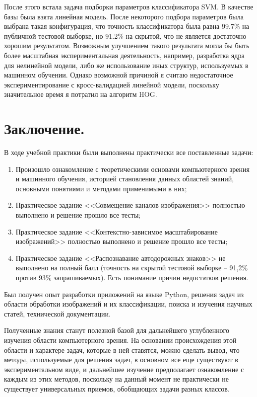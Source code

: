 \documentclass[a4paper, 12pt]{article}
\begin{document}
	После этого встала задача подборки параметров классификатора SVM. В качестве базы была взята линейная модель. После некоторого подбора параметров была выбрана такая конфигурация, что точность классификатора была равна 99.7\% на публичной тестовой выборке, но 91.2\% на скрытой, что не является достаточно хорошим результатом. Возможным улучшением такого результата могла бы  быть более масштабная экспериментальная деятельность, например, разработка ядра для нелинейной модели, либо же использование иных структур, используемых в машинном обучении. Однако возможной причиной я считаю недостаточное экспериментирование с кросс-валидацией линейной модели, поскольку значительное время я потратил на алгоритм HOG.


\newpage
\section*{Заключение.}
%
В ходе учебной практики были выполнены практически все поставленные задачи:
\begin{enumerate}
	\item Произошло ознакомление с теоретическими основами компьютерного зрения и машинного обучения, историей становления данных областей знаний, основными понятиями и методами применимыми в них;
	\item Практическое задание <<Совмещение каналов изображения>> полностью выполнено и решение прошло все тесты;
	\item Практическое задание <<Контекстно-зависимое масштабирование изображений>> полностью выполнено и решение прошло все тесты;
	\item Практическое задание <<Распознавание автодорожных знаков>> не выполнено на полный балл (точность на скрытой тестовой выборке -- 91,2\%  против 93\% запрашиваемых). Есть понимание причин недостатков решения.
\end{enumerate} 

 Был получен опыт разработки приложений на языке Python, решения задач из области обработки изображений и их классификации, поиска и изучения научных статей, технической документации.

Полученные знания станут полезной базой для дальнейшего углубленного изучения области компьютерного зрения. На основании происхождения этой области и характере задач, которые в ней ставятся, можно сделать вывод, что методы, используемые для решения задач, в основном все еще существуют в экспериментальном виде, и дальнейшее изучение предполагает ознакомление с каждым из этих методов, поскольку на данный момент не практически не существует универсальных приемов, обобщающих задачи разных классов.
\end{document}
